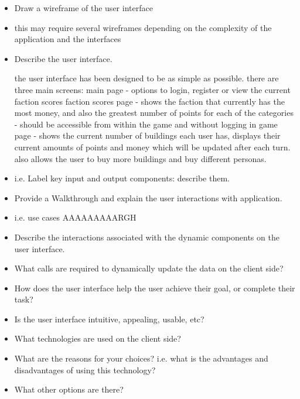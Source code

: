 \documentclass{sig-alt-release2}
\begin{document}
\begin{itemize}

\item	Draw a wireframe of the user interface 

\item	this may require several wireframes depending on the complexity of the application and the interfaces

\item	Describe the user interface.

the user interface has been designed to be as simple as possible. 
there are three main screens: 
main page - options to login, register or view the current faction scores
faction scores page - shows the faction that currently has the most money, and also the greatest number of points for each of the categories - should be accessible from within the game and without logging in
game page - shows the current number of buildings each user has, displays their current amounts of points and money which will be updated after each turn. also allows the user to buy more buildings and buy different personas. 

\item	i.e. Label key input and output components: describe them.

\item	Provide a Walkthrough and explain the user interactions with application. 
\item	i.e. use cases AAAAAAAAARGH

\item	Describe the interactions associated with the dynamic components on the user interface.

\item	What calls are required to dynamically update the data on the client side?

\item	How does the user interface help the user achieve their goal, or complete their task? 

\item	Is the user interface intuitive, appealing, usable, etc?

\item	What technologies are used on the client side? 

\item	What are the reasons for your choices? i.e. what is the advantages and disadvantages of using this technology? 

\item	What other options are there? 

\end{itemize}
\end{document}
